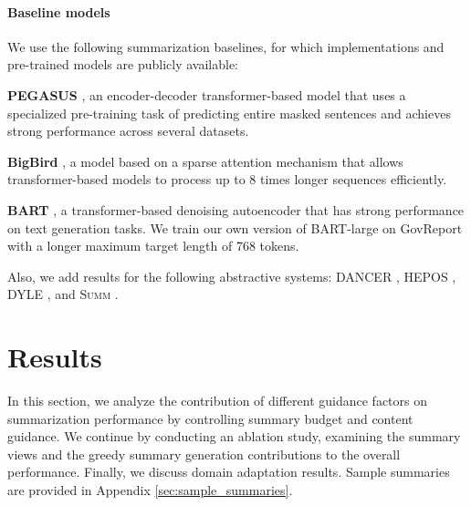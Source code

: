 \documentclass[11pt,table]{article}
\newenvironment{itemizesquish}[2]{\begin{list}{\labelitemi}{\setlength{\itemsep}{#1}\setlength{\labelwidth}{#2}\setlength{\leftmargin}{\labelwidth}\addtolength{\leftmargin}{\labelsep}}}{\end{list}}
\begin{document}
\paragraph{Baseline models}
We use the following summarization baselines, for which implementations and pre-trained models are publicly available:
\begin{itemizesquish}{-0.3em}{0.5em}
    \item \textbf{PEGASUS} \citep{zhang2020pegasus}, an encoder-decoder transformer-based model that uses a specialized pre-training task of predicting entire masked sentences and achieves strong performance across several datasets.
    \item \textbf{BigBird} \citep{zaheer2020big}, a model based on a sparse attention mechanism that allows transformer-based models to process up to 8 times longer sequences efficiently.
    \item \textbf{BART} \citep{lewis2019bart}, a transformer-based denoising autoencoder that has strong performance on text generation tasks. We train our own version of BART-large on GovReport with a longer maximum target length of 768 tokens.
\end{itemizesquish}
Also, we add results for the following abstractive systems: DANCER \citep{gidiotis2020divide}, HEPOS \citep{huang2021efficient}, DYLE \citep{mao_dyle_2022}, and \textsc{Summ} \citep{zhang_summn_2022}.

\section{Results}
\label{sec:results}
In this section, we analyze the contribution of different guidance factors on summarization performance by controlling summary budget and content guidance. We continue by conducting an ablation study, examining the summary views and the greedy summary generation contributions to the overall performance. Finally, we discuss domain adaptation results. Sample summaries are provided in Appendix \ref{sec:sample_summaries}.
\end{document}
